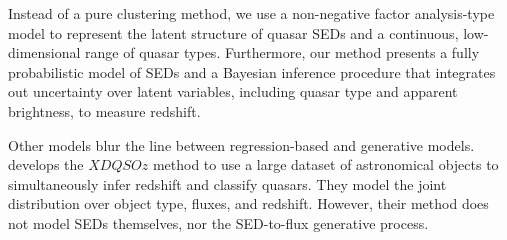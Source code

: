 \documentclass{article}
\newcommand{\red}[1]{\textcolor{red}{[TODO: #1]}}
\begin{document}
Instead of a pure clustering method, we use a non-negative factor analysis-type model to represent the latent structure of quasar SEDs and a continuous, low-dimensional range of quasar types.  
Furthermore, our method presents a fully probabilistic model of SEDs and a Bayesian inference procedure that integrates out uncertainty over latent variables, including quasar type and apparent brightness, to measure redshift.    

Other models blur the line between regression-based and generative models.  \citet{bovy2012photometric} develops the $XDQSOz$ method to use a large dataset of astronomical objects to simultaneously infer redshift and classify quasars.  
They model the joint distribution over object type, fluxes, and redshift.  However, their method does not model SEDs themselves, nor the SED-to-flux generative process. 




\end{document}
